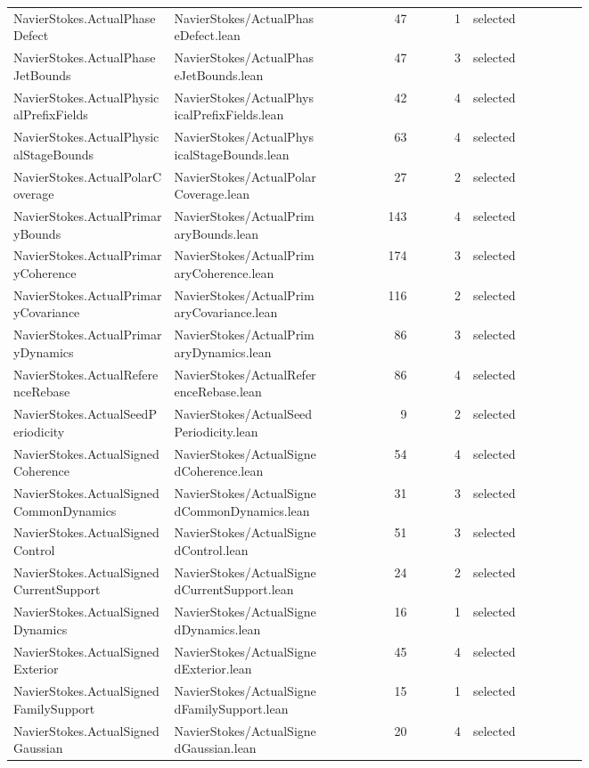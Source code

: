 \documentclass[10pt]{article}
\begin{document}
\begin{longtable}{p{0.28\linewidth}p{0.27\linewidth}r r p{0.20\linewidth}}
NavierStokes.ActualPhaseDefect & NavierStokes/ActualPhaseDefect.lean & 47 & 1 & selected\\
NavierStokes.ActualPhaseJetBounds & NavierStokes/ActualPhaseJetBounds.lean & 47 & 3 & selected\\
NavierStokes.ActualPhysicalPrefixFields & NavierStokes/ActualPhysicalPrefixFields.lean & 42 & 4 & selected\\
NavierStokes.ActualPhysicalStageBounds & NavierStokes/ActualPhysicalStageBounds.lean & 63 & 4 & selected\\
NavierStokes.ActualPolarCoverage & NavierStokes/ActualPolarCoverage.lean & 27 & 2 & selected\\
NavierStokes.ActualPrimaryBounds & NavierStokes/ActualPrimaryBounds.lean & 143 & 4 & selected\\
NavierStokes.ActualPrimaryCoherence & NavierStokes/ActualPrimaryCoherence.lean & 174 & 3 & selected\\
NavierStokes.ActualPrimaryCovariance & NavierStokes/ActualPrimaryCovariance.lean & 116 & 2 & selected\\
NavierStokes.ActualPrimaryDynamics & NavierStokes/ActualPrimaryDynamics.lean & 86 & 3 & selected\\
NavierStokes.ActualReferenceRebase & NavierStokes/ActualReferenceRebase.lean & 86 & 4 & selected\\
NavierStokes.ActualSeedPeriodicity & NavierStokes/ActualSeedPeriodicity.lean & 9 & 2 & selected\\
NavierStokes.ActualSignedCoherence & NavierStokes/ActualSignedCoherence.lean & 54 & 4 & selected\\
NavierStokes.ActualSignedCommonDynamics & NavierStokes/ActualSignedCommonDynamics.lean & 31 & 3 & selected\\
NavierStokes.ActualSignedControl & NavierStokes/ActualSignedControl.lean & 51 & 3 & selected\\
NavierStokes.ActualSignedCurrentSupport & NavierStokes/ActualSignedCurrentSupport.lean & 24 & 2 & selected\\
NavierStokes.ActualSignedDynamics & NavierStokes/ActualSignedDynamics.lean & 16 & 1 & selected\\
NavierStokes.ActualSignedExterior & NavierStokes/ActualSignedExterior.lean & 45 & 4 & selected\\
NavierStokes.ActualSignedFamilySupport & NavierStokes/ActualSignedFamilySupport.lean & 15 & 1 & selected\\
NavierStokes.ActualSignedGaussian & NavierStokes/ActualSignedGaussian.lean & 20 & 4 & selected\\

\end{longtable}
\end{document}
